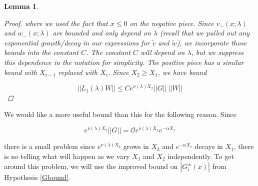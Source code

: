 \documentclass[12pt]{article}
\newtheorem{lemma}{Lemma}
\begin{document}
\begin{lemma}
\begin{proof}
where we used the fact that $x \leq 0$ on the negative piece. Since $v_-(x; 
\lambda)$ and $w_-(x; \lambda)$ are bounded and only depend on $\lambda$ (recall that we pulled out any exponential growth/decay in our expressions for $\tilde{v}$ and $\tilde{w}$), we incorporate those bounds into the constant $C$. The constant $C$ will depend on $\lambda$, but we suppress this dependence in the notation for simplicity. The positive piece has a similar bound with $X_{i-1}$ replaced with $X_i$. Since $X_2 \geq X_1$, we have bound

\[
||L_1(\lambda)W|| \leq C e^{\nu(\lambda)X_2} ||G|| \: ||W||
\]
\end{proof}
\end{lemma}

We would like a more useful bound than this for the following reason. Since 

\[
e^{\nu(\lambda)X_2} ||G|| = \mathcal{O} e^{\nu(\lambda)X_2} e^{-\alpha X_1}
\]

there is a small problem since $e^{\nu(\lambda)X_2}$ grows in $X_2$ and $e^{-\alpha X_1}$ decays in $X_1$, there is no telling what will happen as we vary $X_1$ and $X_2$ independently. To get around this problem, we will use the improved bound on $|G_i^\pm(x)|$ from Hypothesis \ref{Gbound}.

\end{document}
